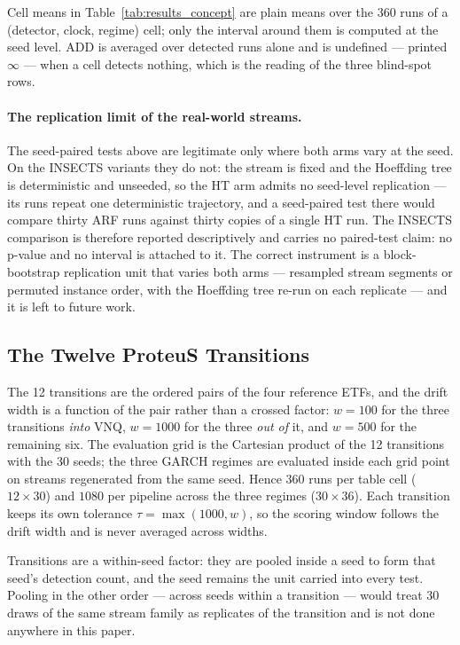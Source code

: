 Cell means in Table~\ref{tab:results_concept} are plain means over the 360 runs of a
(detector, clock, regime) cell; only the interval around them is computed at
the seed level. $\mathrm{ADD}$ is averaged over detected runs alone and is undefined --- printed
$\infty$ --- when a cell detects nothing, which is the reading of the three blind-spot rows.

\paragraph{The replication limit of the real-world streams.}
The seed-paired tests above are legitimate only where both arms vary at the seed. On the INSECTS
variants they do not: the stream is fixed and the Hoeffding tree is deterministic and unseeded, so
the HT arm admits no seed-level replication --- its runs repeat one deterministic trajectory, and a
seed-paired test there would compare thirty ARF runs against thirty copies of a single HT run. The
INSECTS comparison is therefore reported descriptively and carries no paired-test claim: no
p-value and no interval is attached to it. The correct instrument is a block-bootstrap replication
unit that varies both arms --- resampled stream segments or permuted instance order, with the
Hoeffding tree re-run on each replicate --- and it is left to future work.

\subsection{The Twelve ProteuS Transitions}\label{sec:protocol_transitions}

The 12 transitions are the ordered pairs of the four reference ETFs, and the drift width is a
function of the pair rather than a crossed factor: $w = 100$ for the three transitions \emph{into}
VNQ, $w = 1000$ for the three \emph{out of} it, and $w = 500$ for the remaining six. The evaluation
grid is the Cartesian product of the 12 transitions with the 30 seeds; the three GARCH regimes are
evaluated inside each grid point on streams regenerated from the same seed. Hence $360$ runs per
table cell ($12 \times 30$) and $1080$ per pipeline across the three regimes
($30 \times 36$). Each transition keeps its own tolerance $\tau = \max(1000, w)$, so the scoring
window follows the drift width and is never averaged across widths.

Transitions are a within-seed factor: they are pooled inside a seed to form that seed's detection
count, and the seed remains the unit carried into every test. Pooling in the other order --- across
seeds within a transition --- would treat 30 draws of the same stream family as replicates of the
transition and is not done anywhere in this paper.

